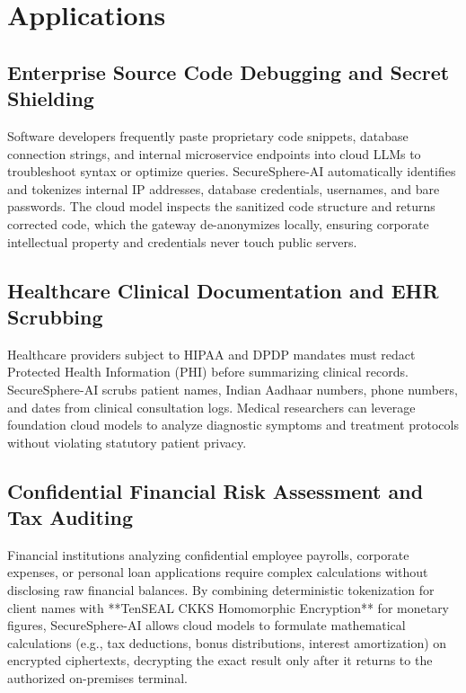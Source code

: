 \section{Applications}

\subsection{Enterprise Source Code Debugging and Secret Shielding}
Software developers frequently paste proprietary code snippets, database connection strings, and internal microservice endpoints into cloud LLMs to troubleshoot syntax or optimize queries. SecureSphere-AI automatically identifies and tokenizes internal IP addresses, database credentials, usernames, and bare passwords. The cloud model inspects the sanitized code structure and returns corrected code, which the gateway de-anonymizes locally, ensuring corporate intellectual property and credentials never touch public servers.

\subsection{Healthcare Clinical Documentation and EHR Scrubbing}
Healthcare providers subject to HIPAA and DPDP mandates must redact Protected Health Information (PHI) before summarizing clinical records. SecureSphere-AI scrubs patient names, Indian Aadhaar numbers, phone numbers, and dates from clinical consultation logs. Medical researchers can leverage foundation cloud models to analyze diagnostic symptoms and treatment protocols without violating statutory patient privacy.

\subsection{Confidential Financial Risk Assessment and Tax Auditing}
Financial institutions analyzing confidential employee payrolls, corporate expenses, or personal loan applications require complex calculations without disclosing raw financial balances. By combining deterministic tokenization for client names with **TenSEAL CKKS Homomorphic Encryption** for monetary figures, SecureSphere-AI allows cloud models to formulate mathematical calculations (e.g., tax deductions, bonus distributions, interest amortization) on encrypted ciphertexts, decrypting the exact result only after it returns to the authorized on-premises terminal.
